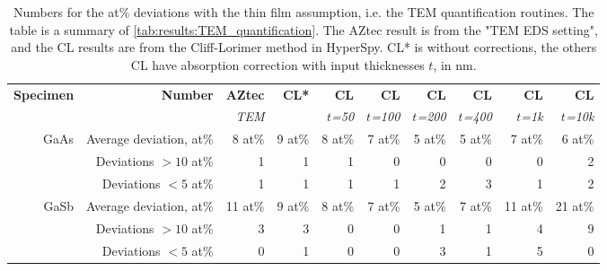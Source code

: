 \begin{table}[phtb]
    \begin{center}
        \caption{
            Numbers for the at\% deviations with the thin film assumption, i.e. the TEM quantification routines.
            The table is a summary of \cref{tab:results:TEM_quantification}.
            The AZtec result is from the "TEM EDS setting", and the CL results are from the Cliff-Lorimer method in HyperSpy.
            CL* is without corrections, the others CL have absorption correction with input thicknesses $t$, in nm.
        }
        \label{tab:results:TEM_quantification_stats}
        \begin{tabular}{rrrrrrrrrr}
            \hline
            \textbf{Specimen} & \textbf{Number}         & \textbf{AZtec} & \textbf{CL*} & \textbf{CL}   & \textbf{CL}    & \textbf{CL}    & \textbf{CL}    & \textbf{CL}   & \textbf{CL}    \\
            \emph{}           & \emph{}                 & \emph{TEM}        & \emph{}      & \emph{$t$=50} & \emph{$t$=100} & \emph{$t$=200} & \emph{$t$=400} & \emph{$t$=1k} & \emph{$t$=10k} \\
            \hline
            GaAs              & Average deviation, at\% & 8 at\%         & 9 at\%       & 8 at\%        & 7 at\%         & 5 at\%         & 5 at\%         & 7 at\%        & 6 at\%         \\
                              & Deviations $>10$ at\%   & 1              & 1            & 1             & 0              & 0              & 0              & 0             & 2              \\
                              & Deviations  $<5$  at\%  & 1              & 1            & 1             & 1              & 2              & 3              & 1             & 2              \\
            \hline
            GaSb              & Average deviation, at\% & 11 at\%        & 9 at\%       & 8 at\%        & 7 at\%         & 5 at\%         & 7 at\%         & 11 at\%       & 21 at\%        \\
                              & Deviations $>10$ at\%   & 3              & 3            & 0             & 0              & 1              & 1              & 4             & 9              \\
                              & Deviations  $<5$  at\%  & 0              & 1            & 0             & 0              & 3              & 1              & 5             & 0              \\
            \hline
        \end{tabular}
    \end{center}
\end{table}

